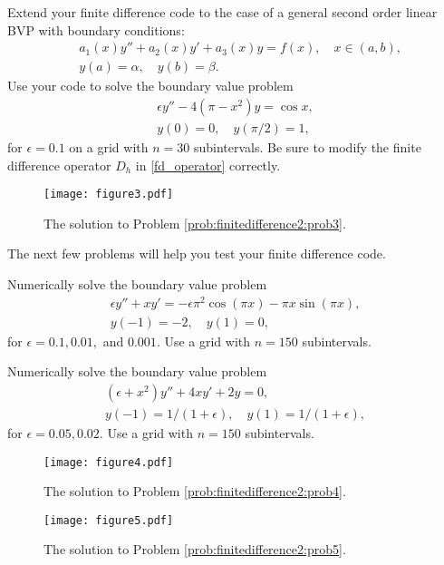 \begin{problem}
Extend your finite difference code to the case of a general second order linear BVP with boundary conditions:
\begin{align*}
	&{ } a_1(x)y'' +a_2(x)y'+ a_3(x) y = f(x), \quad x \in (a,b),\\
	&{ } y(a) = \alpha, \quad y(b) = \beta.
\end{align*}
Use your code to solve the boundary value problem
\begin{align*}
	\epsilon y'' - 4(\pi - x^2)y = \cos x, \\
	y(0) = 0, \quad y(\pi/2) = 1,
\end{align*}
for $\epsilon = 0.1$ on a grid with $n=30$ subintervals.
\label{prob:finitedifference2:prob3}
Be sure to modify the finite difference operator $D_h$ in \eqref{fd_operator} correctly.

\end{problem}



\begin{figure}[h]
\centering
\texttt{[image: figure3.pdf]}
\caption{The solution to Problem \ref{prob:finitedifference2:prob3}.
}
\end{figure}


The next few problems will help you test your finite difference code.

\begin{problem}
Numerically solve the boundary value problem
\begin{align*}
	\epsilon y'' + xy' = -\epsilon \pi^2 \cos(\pi x) - \pi x \sin(\pi x), \\
	y(-1) = -2, \quad y(1) = 0,
\end{align*}
for $\epsilon = 0.1, 0.01,$ and $0.001$. Use a grid with $n=150$ subintervals.
\label{prob:finitedifference2:prob4}
\end{problem}

\begin{problem}
Numerically solve the boundary value problem
\begin{align*}
	(\epsilon +x^2)y'' + 4xy' + 2y = 0, \\
	y(-1) = 1/(1+\epsilon), \quad y(1) = 1/(1+\epsilon),
\end{align*}
for $\epsilon = 0.05, 0.02$. Use a grid with $n=150$ subintervals.
\label{prob:finitedifference2:prob5}
\end{problem}

\begin{figure}[h]
\centering
\texttt{[image: figure4.pdf]}
\caption{The solution to Problem \ref{prob:finitedifference2:prob4}.
}
\end{figure}

\begin{figure}
\centering
\texttt{[image: figure5.pdf]}
\caption{The solution to Problem \ref{prob:finitedifference2:prob5}.
}
\end{figure}
